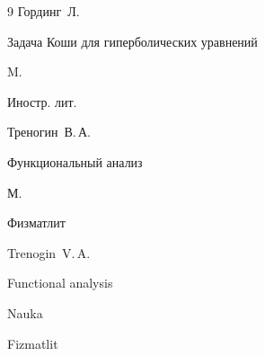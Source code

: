 \begin{thebibliography}{9}
\by Гординг~Л.

\book Задача Коши для гиперболических уравнений

\publaddr M.

\publ Иностр. лит.






\by Треногин~В.\,А.

\book Функциональный анализ

\publaddr М.

\publ Физматлит



\misctransl

\by Trenogin~V.\,A.

\book Functional analysis

\publ Nauka

\publaddr Fizmatlit






\end{thebibliography}











\noindent

\hskip6.5cm \thedate \par\noindent

\hskip6.5cm\therevdate









\makeengtitlem







\newpage














%

